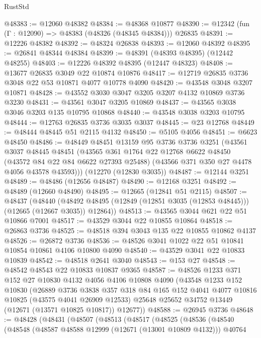 \begin{lexlean}{RustStd}
\begin{coremodule}
@48383 := @12060 @48382
@48384 := @48368 @10877
@48390 := @12342 (fun (Γ : @12090) => @48383 (@48326 (@48345 @48384))) @26835
@48391 := @12226 @48382
@48392 := @48324 @26838
@48393 := @12060 @48392
@48395 := @26841 @48344 @48384
@48399 := @48391 (@48393 @48395) (@12442 @48255)
@48403 := @12226 @48392 @48395 (@12447 @48323)
@48408 := @13677 @26835 @3049 @22 @10874 @10876
@48417 := @12719 @26835 @3736 @3048 @22 @53 @10871 @4077 @10778 @4090
@48420 := @43548 @3048 @3207 @10871
@48428 := @43552 @3030 @3047 @3205 @3207 @4132 @10869 @3736 @3230
@48431 := @43561 @3047 @3205 @10869
@48437 := @43565 @3038 @3046 @3203 @135 @10795 @10868
@48440 := @43548 @3038 @3203 @10795
@48444 := @12763 @26835 @3736 @3035 @3037
@48445 := @23 @12768
@48449 := @48444 @48445 @51 @2115 @4132
@48450 := @5105 @4056
@48451 := @6623 @48450
@48486 := @48449
    @48451
    @13159
    @95
    @3736
    @3736
    @3251
    (@43561
      @3037
      @48445
      @48451
      (@43565
        @361
        @1764
        @22
        @12768
        @6622
        @48450
        (@43572 @84 @22 @84 @6622 @27393 @25488)
        (@43566 @371 @350 @27 @4478 @4056 @43578 @43593)))
    (@12270 (@12830 @3035))
@48487 := @12144 @3251
@48489 := @48486 (@12656 @48487)
@48490 := @12168 @3251
@48492 := @48489 (@12660 @48490)
@48495 := @12665 (@12841 @51 @2115)
@48507 := @48437
    (@48440 (@48492 @48495 (@12849 (@12851 @3035 (@12853 @48445))) (@12665 (@12667 @3035)) @12864))
@48513 := @43565 @3044 @621 @22 @51 @10866 @7001
@48517 := @43529 @3044 @22 @10855 @10864
@48518 := @26863 @3736
@48525 := @48518 @394 @3043 @135 @22 @10855 @10862 @4137
@48526 := @26872 @3736
@48536 := @48526 @3041 @1022 @22 @51 @10841 @10854 @10861 @4106 @10800 @4090
@48540 := @43529 @3041 @22 @10833 @10839
@48542 := @48518 @2641 @3040
@48543 := @153 @27
@48548 := @48542 @48543 @22 @10833 @10837 @9365
@48587 := @48526
    @1233
    @371
    @152
    @27
    @10830
    @4132
    @4056
    @4106
    @10808
    @4090
    (@43548
      @1233
      @152
      @10830
      (@26889
        @3736
        @3838
        @357
        @318
        @84
        @165
        @152
        @4041
        @4077
        @10816
        @10825
        (@43575 @4041 @26909 @12533)
        @25648
        @25652
        @34752
        @13449
        (@12671 (@13571 @10825 @10817))
        @12677))
@48588 := @26945 @3736
@48648 := @48428
    (@48431
      (@48507
        (@48513
          (@48517
            (@48525
              (@48536
                (@48540
                  (@48548
                    (@48587 @48588 @12999 (@12671 (@13001 @10809 @4132)))
                    @40764

\end{coremodule}
\end{lexlean}
